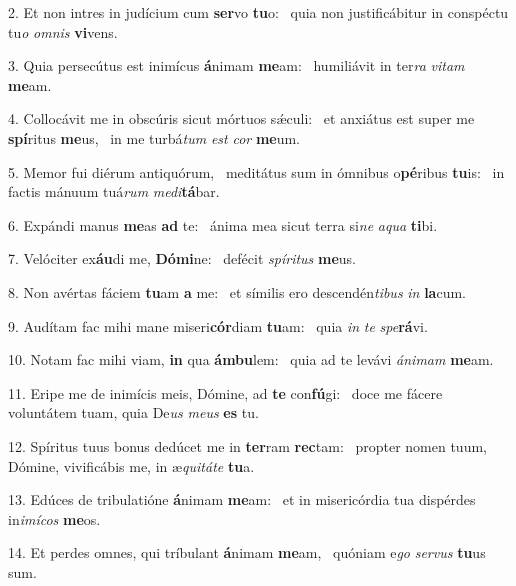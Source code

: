 2. Et non intres in judícium cum \textbf{ser}vo \textbf{tu}o: \ast\  quia non justificábitur in conspéctu tu\textit{o} \textit{om}\textit{nis} \textbf{vi}vens.\

3. Quia persecútus est inimícus \textbf{á}nimam \textbf{me}am: \ast\  humiliávit in ter\textit{ra} \textit{vi}\textit{tam} \textbf{me}am.\

4. Collocávit me in obscúris sicut mórtuos sǽculi: \dag\  et anxiátus est super me \textbf{spí}ritus \textbf{me}us, \ast\  in me turbá\textit{tum} \textit{est} \textit{cor} \textbf{me}um.\

5. Memor fui diérum antiquórum, \dag\  meditátus sum in ómnibus o\textbf{pé}ribus \textbf{tu}is: \ast\  in factis mánuum tuá\textit{rum} \textit{me}\textit{di}\textbf{tá}bar.\

6. Expándi manus \textbf{me}as \textbf{ad} te: \ast\  ánima mea sicut terra si\textit{ne} \textit{a}\textit{qua} \textbf{ti}bi.\

7. Velóciter ex\textbf{áu}di me, \textbf{Dó}\textbf{mi}ne: \ast\  defécit \textit{spí}\textit{ri}\textit{tus} \textbf{me}us.\

8. Non avértas fáciem \textbf{tu}am \textbf{a} me: \ast\  et símilis ero descendén\textit{ti}\textit{bus} \textit{in} \textbf{la}cum.\

9. Audítam fac mihi mane miseri\textbf{cór}diam \textbf{tu}am: \ast\  quia \textit{in} \textit{te} \textit{spe}\textbf{rá}vi.\

10. Notam fac mihi viam, \textbf{in} qua \textbf{ám}\textbf{bu}lem: \ast\  quia ad te levávi \textit{á}\textit{ni}\textit{mam} \textbf{me}am.\

11. Eripe me de inimícis meis, Dómine, ad \textbf{te} con\textbf{fú}gi: \ast\  doce me fácere voluntátem tuam, quia De\textit{us} \textit{me}\textit{us} \textbf{es} tu.\

12. Spíritus tuus bonus dedúcet me in \textbf{ter}ram \textbf{rec}tam: \ast\  propter nomen tuum, Dómine, vivificábis me, in æ\textit{qui}\textit{tá}\textit{te} \textbf{tu}a.\

13. Edúces de tribulatióne \textbf{á}nimam \textbf{me}am: \ast\  et in misericórdia tua dispérdes in\textit{i}\textit{mí}\textit{cos} \textbf{me}os.\

14. Et perdes omnes, qui tríbulant \textbf{á}nimam \textbf{me}am, \ast\  quóniam e\textit{go} \textit{ser}\textit{vus} \textbf{tu}us sum.\

